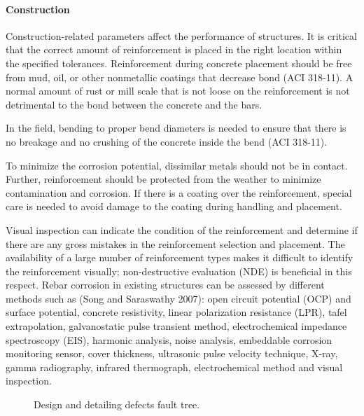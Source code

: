 \paragraph{Construction}
Construction-related parameters affect the performance of structures. It is critical that the correct amount of reinforcement is placed in the right location within the specified tolerances. Reinforcement during concrete placement should be free from mud, oil, or other nonmetallic coatings that decrease bond (ACI 318-11). A normal amount of rust or mill scale that is not loose on the reinforcement is not detrimental to the bond between the concrete and the bars.

In the field, bending to proper bend diameters is needed to ensure that there is no breakage and no crushing of the concrete inside the bend (ACI 318-11).

To minimize the corrosion potential, dissimilar metals should not be in contact. Further, reinforcement should be protected from the weather to minimize contamination and corrosion. If there is a coating over the reinforcement, special care is needed to avoid damage to the coating during handling and placement.

Visual inspection can indicate the condition of the reinforcement and determine if there are any gross mistakes in the reinforcement selection and placement. The availability of a large number of reinforcement types makes it difficult to identify the reinforcement visually; non-destructive evaluation (NDE) is beneficial in this respect. Rebar corrosion in existing structures can be assessed by different methods such as (Song and Saraswathy 2007): open circuit potential (OCP) and surface potential, concrete resistivity, linear polarization resistance (LPR), tafel extrapolation, galvanostatic pulse transient method, electrochemical impedance spectroscopy (EIS), harmonic analysis, noise analysis, embeddable corrosion monitoring sensor, cover thickness, ultrasonic pulse velocity technique, X-ray, gamma radiography, infrared thermograph, electrochemical method and visual inspection.

\begin{figure}
  \caption{Design and detailing defects fault tree.}\label{fig:fault-tree-design-detailing}
\end{figure}

